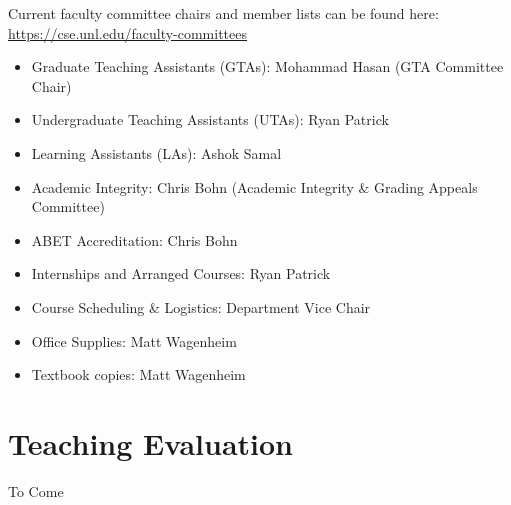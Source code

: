\documentclass[12pt]{scrartcl}
\begin{document}
Current faculty committee chairs and member lists can be found
here: \url{https://cse.unl.edu/faculty-committees}

\begin{itemize}
  \item Graduate Teaching Assistants (GTAs): Mohammad Hasan (GTA Committee Chair)
  \item Undergraduate Teaching Assistants (UTAs): Ryan Patrick
  \item Learning Assistants (LAs): Ashok Samal
  \item Academic Integrity: Chris Bohn (Academic Integrity \& Grading Appeals Committee)
  \item ABET Accreditation: Chris Bohn
  \item Internships and Arranged Courses: Ryan Patrick
  \item Course Scheduling \& Logistics: Department Vice Chair
  \item Office Supplies: Matt Wagenheim
  \item Textbook copies: Matt Wagenheim
\end{itemize}

\section{Teaching Evaluation}

To Come
\end{document}
